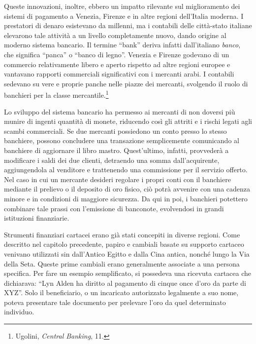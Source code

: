 \documentclass[
  a5paper,
  smalldemyvopaper,10pt,twoside,onecolumn,openright,extrafontsizes,hidelinks]{memoir}
\begin{document}
Queste innovazioni, inoltre, ebbero un impatto rilevante sul
miglioramento dei sistemi di pagamento a Venezia, Firenze e in altre
regioni dell'Italia moderna. I prestatori di denaro esistevano da
millenni, ma i contabili delle città-stato italiane elevarono tale
attività a un livello completamente nuovo, dando origine al moderno
sistema bancario. Il termine ``bank'' deriva infatti dall'italiano
\emph{banco}, che significa ``panca'' o ``banco di legno''. Venezia e
Firenze godevano di un commercio relativamente libero e aperto rispetto
ad altre regioni europee e vantavano rapporti commerciali significativi
con i mercanti arabi. I contabili sedevano su vere e proprie panche
nelle piazze dei mercanti, svolgendo il ruolo di banchieri per la classe
mercantile.\footnote{Ugolini, \emph{Central Banking}, 11.}

Lo sviluppo del sistema bancario ha permesso ai mercanti di non doversi
più munire di ingenti quantità di monete, riducendo così gli attriti e i
rischi legati agli scambi commerciali. Se due mercanti possiedono un
conto presso lo stesso banchiere, possono concludere una transazione
semplicemente comunicando al banchiere di aggiornare il libro mastro.
Quest'ultimo, infatti, provvederà a modificare i saldi dei due clienti,
detraendo una somma dall'acquirente, aggiungendola al venditore e
trattenendo una commissione per il servizio offerto. Nel caso in cui un
mercante desideri regolare i propri conti con il banchiere mediante il
prelievo o il deposito di oro fisico, ciò potrà avvenire con una cadenza
minore e in condizioni di maggiore sicurezza. Da qui in poi, i banchieri
potettero combinare tale prassi con l'emissione di banconote,
evolvendosi in grandi istituzioni finanziarie.

Strumenti finanziari cartacei erano già stati concepiti in diverse
regioni. Come descritto nel capitolo precedente, papiro e cambiali
basate su supporto cartaceo venivano utilizzati sin dall'Antico Egitto e
dalla Cina antica, nonché lungo la Via della Seta. Queste prime cambiali
erano generalmente associate a una persona specifica. Per fare un
esempio semplificato, si possedeva una ricevuta cartacea che dichiarava:
``Lyn Alden ha diritto al pagamento di cinque once d'oro da parte di
XYZ''. Solo il beneficiario, o un incaricato autorizzato legalmente a
suo nome, poteva presentare tale documento per prelevare l'oro da quel
determinato individuo.
\end{document}
